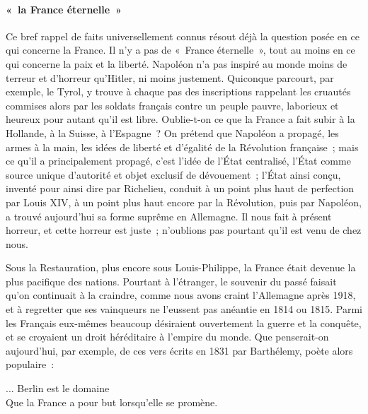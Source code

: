 \documentclass[french,twoside]{book} %
\newenvironment{quoteblock}%
  {\begin{quoting}}
  {\end{quoting}}
\newenvironment{quotebar}{%
    \def\FrameCommand{{\color{rubric!10!}\vrule width 0.5em} \hspace{0.9em}}%
    \def\OuterFrameSep{\itemsep} %
    \MakeFramed {\advance\hsize-\width \FrameRestore}
  }%
  {%
    \endMakeFramed
  }
\renewenvironment{quoteblock}%
  {%
    \savenotes
    \setstretch{0.9}
    \normalfont
    \begin{quotebar}
  }
  {%
    \end{quotebar}
    \spewnotes
  }
\begin{document}
\paragraph[« la France éternelle »]{« la France éternelle »}
\noindent Ce bref rappel de faits universellement connus résout déjà la question posée en ce qui concerne la France. Il n'y a pas de « France éternelle », tout au moins en ce qui concerne la paix et la liberté. Napoléon n'a pas inspiré au monde moins de terreur et d'horreur qu'Hitler, ni moins justement. Quiconque parcourt, par exemple, le Tyrol, y trouve à chaque pas des inscriptions rappe­lant les cruautés commises alors par les soldats français contre un peuple pauvre, laborieux et heureux pour autant qu'il est libre. Oublie-t-on ce que la France a fait subir à la Hollande, à la Suisse, à l'Espagne ? On prétend que Napoléon a propagé, les armes à la main, les idées de liberté et d'égalité de la Révolution française ; mais ce qu'il a principalement propagé, c'est l'idée de l'État centralisé, l'État comme source unique d'autorité et objet exclusif de dévouement ; l'État ainsi conçu, inventé pour ainsi dire par Richelieu, conduit à un point plus haut de perfection par Louis XIV, à un point plus haut encore par la Révolution, puis par Napoléon, a trouvé aujourd'hui sa forme suprême en Allemagne. Il nous fait à présent horreur, et cette horreur est juste ; n'oublions pas pourtant qu'il est venu de chez nous.\par
Sous la Restauration, plus encore sous Louis-Philippe, la France était de­venue la plus pacifique des nations. Pourtant à l'étranger, le souvenir du passé faisait qu'on continuait à la craindre, comme nous avons craint l'Allemagne après 1918, et à regretter que ses vainqueurs ne l'eussent pas anéantie en 1814 ou 1815. Parmi les Français eux-mêmes beaucoup désiraient ouvertement la guerre et la conquête, et se croyaient un droit héréditaire à l'empire du monde. Que penserait-on aujourd'hui, par exemple, de ces vers écrits en 1831 par Barthélemy, poète alors populaire :\par

\begin{quoteblock}
 \noindent ... Berlin est le domaine \\
Que la France a pour but lorsqu'elle se promène.
 \end{quoteblock}
\end{document}
